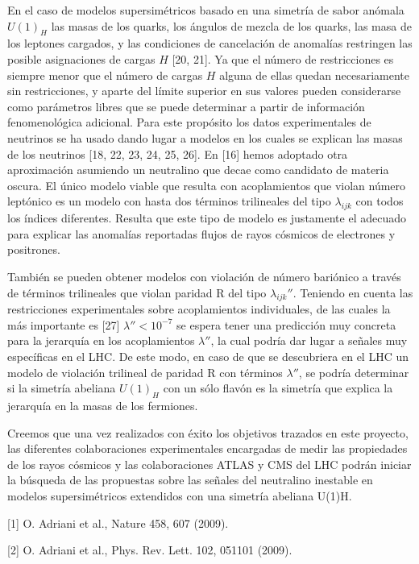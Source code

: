 En el caso de modelos supersimétricos basado en una simetría de sabor anómala $U(1)_H$ 
las masas de los quarks, los ángulos de mezcla de los quarks, las masa de los leptones cargados, 
y las condiciones de cancelación de anomalías restringen las posible asignaciones de cargas $H$ [20, 21]. 
Ya que el número de restricciones es siempre menor que el número de cargas $H$ alguna de ellas 
quedan necesariamente sin restricciones, y aparte del límite superior en sus valores pueden 
considerarse como parámetros libres que se puede determinar a partir de información 
fenomenológica adicional. Para este propósito los datos experimentales de neutrinos 
se ha usado dando lugar a modelos en los cuales se explican las masas de los 
neutrinos [18, 22, 23, 24, 25, 26]. En [16] hemos adoptado otra aproximación 
asumiendo un neutralino que decae como candidato de materia oscura. El único modelo 
viable que resulta con acoplamientos que violan número leptónico es un modelo con 
hasta dos términos trilineales del tipo $\lambda_{ijk}$ con todos los índices diferentes. 
Resulta que este tipo de modelo es justamente el adecuado para explicar las anomalías 
reportadas flujos de rayos cósmicos de electrones y positrones.

También se pueden obtener modelos con violación de número bariónico a través de 
términos trilineales que violan paridad R del tipo $\lambda_{ijk}''$. Teniendo en cuenta las 
restricciones experimentales sobre acoplamientos individuales, de las cuales la más 
importante es [27] $\lambda''< 10^{-7}$ se espera tener una predicción muy concreta para la 
jerarquía en los acoplamientos $\lambda''$, la cual podría dar lugar a señales muy específicas 
en el LHC. De este modo, en caso de que se descubriera en el LHC un modelo de violación 
trilineal de paridad R con términos $\lambda''$, se podría determinar si la simetría abeliana 
$U(1)_H$ con un sólo flavón es la simetría que explica la jerarquía en la masas de los fermiones.


Creemos que una vez realizados con éxito los objetivos trazados en este proyecto, 
las diferentes colaboraciones experimentales encargadas de medir las propiedades 
de los rayos cósmicos y las colaboraciones ATLAS y CMS del LHC podrán iniciar 
la búsqueda de las propuestas sobre las señales del neutralino inestable en modelos 
supersimétricos extendidos con una simetría abeliana U(1)H. 

[1] O. Adriani et al., Nature 458, 607 (2009).

[2] O. Adriani et al., Phys. Rev. Lett. 102, 051101 (2009).

